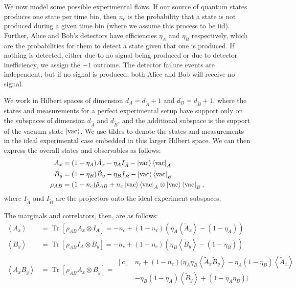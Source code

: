 \documentclass[10pt, a4paper]{article}
\numberwithin{equation}{section} %
\theoremstyle{definition}
\theoremstyle{plain}
\newcommand{\?}{\mathrel{?}} %
\newcommand{\angleb}[1]{\left\langle #1 \right\rangle} %
\newcommand{\Tr}[2][]{\mathop{\mathrm{Tr}#1}\left[ #2 \right]} %
\begin{document}
            We now model some possible experimental flaws. If our source of quantum states produces one state per time bin, then \(n_c\) is the probability that a state is not produced during a given time bin (where we assume this process to be iid). Further, Alice and Bob's detectors have efficiencies \(\eta_A\) and \(\eta_B\) respectively, which are the probabilities for them to detect a state given that one is produced. If nothing is detected, either due to no signal being produced or due to detector inefficiency, we assign the \(-1\) outcome. The detector failure events are independent, but if no signal is produced, both Alice and Bob will receive no signal.

            We work in Hilbert spaces of dimension \(d_{A} = d_{\tilde{A}} + 1\) and \(d_{B} = d_{\tilde{B}} + 1\), where the states and measurements for a perfect experimental setup have support only on the subspaces of dimension \(d_{\tilde{A}}\) and \(d_{\tilde{B}}\), and the additional subspace is the support of the vacuum state \(\ket{\rm vac}\). We use tildes to denote the states and measurements in the ideal experimental case embedded in this larger Hilbert space. We can then express the overall states and observables as follows:
            \begin{align*}
              A_x &= (1-\eta_A)\tilde{A}_x - \eta_A I_{\tilde{A}} - \ket{\rm vac}\bra{\rm vac}_{A} \\
              B_y &= (1-\eta_B)\tilde{B}_y - \eta_B I_{\tilde{B}} - \ket{\rm vac}\bra{\rm vac}_{B} \\
              \rho_{AB} &= (1-n_c)\tilde{\rho}_{AB} + n_c \ket{\rm vac}\bra{\rm vac}_{A} \otimes \ket{\rm vac}\bra{\rm vac}_{B},
            \end{align*}
            where \(I_{\tilde{A}}\) and \(I_{\tilde{B}}\) are the projectors onto the ideal experiment subspaces.

            The marginals and correlators, then, are as follows:
            \begin{align*}
            \angleb{A_x} &= \Tr{\rho_{AB} A_x \otimes I_A} = -n_c + (1-n_c)(\eta_A\angleb{\tilde{A}_x} - (1-\eta_A)) \\
          \angleb{B_y} &= \Tr{\rho_{AB} I_A \otimes B_y} = -n_c + (1-n_c)(\eta_B\angleb{\tilde{B}_y} - (1-\eta_B)) \\
        \angleb{A_x B_y} &= \Tr{\rho_{AB} A_x \otimes B_y} = \begin{aligned}[c]
      & n_c + (1-n_c)(\eta_A\eta_B\angleb{\tilde{A}_x\tilde{B}_y} - \eta_A(1-\eta_B)\angleb{\tilde{A}_x} \\
      & -\eta_B(1-\eta_A)\angleb{\tilde{B}_y} + (1-\eta_A\eta_B) )
              \end{aligned}
              \end{align*}
\end{document}
